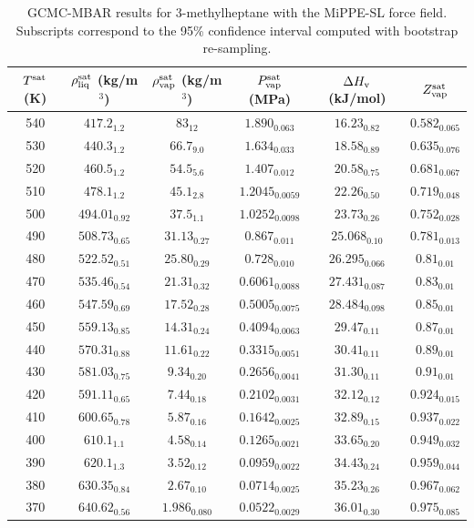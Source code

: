 \documentclass[journal=jctc,manuscript=article]{achemso}
\begin{document}
\begin{table}[htb!]
	\caption{GCMC-MBAR results for 3-methylheptane with the MiPPE-SL force field. Subscripts correspond to the 95\% confidence interval computed with bootstrap re-sampling.}
	\begin{center}
		\begin{tabular}{|c|c|c|c|c|c|}
			\hline
			$T^{\rm sat}$ (K) & $\rho_{\rm liq}^{\rm sat}$ (kg/m$^3$) & $\rho_{\rm vap}^{\rm sat}$ (kg/m$^3$) & $P_{\rm vap}^{\rm sat}$ (MPa) & $\Delta H_{\rm v}$ (kJ/mol) & $Z_{\rm vap}^{\rm sat}$ \\ \hline
			540 & $417.2_{1.2}$ & $83_{12}$ & $1.890_{0.063}$ & $16.23_{0.82}$ & $0.582_{0.065}$ \\
			530 & $440.3_{1.2}$ & $66.7_{9.0}$ & $1.634_{0.033}$ & $18.58_{0.89}$ & $0.635_{0.076}$ \\
			520 & $460.5_{1.2}$ & $54.5_{5.6}$ & $1.407_{0.012}$ & $20.58_{0.75}$ & $0.681_{0.067}$ \\
			510 & $478.1_{1.2}$ & $45.1_{2.8}$ & $1.2045_{0.0059}$ & $22.26_{0.50}$ & $0.719_{0.048}$ \\
			500 & $494.01_{0.92}$ & $37.5_{1.1}$ & $1.0252_{0.0098}$ & $23.73_{0.26}$ & $0.752_{0.028}$ \\
			490 & $508.73_{0.65}$ & $31.13_{0.27}$ & $0.867_{0.011}$ & $25.068_{0.10}$ & $0.781_{0.013}$ \\
			480 & $522.52_{0.51}$ & $25.80_{0.29}$ & $0.728_{0.010}$ & $26.295_{0.066}$ & $0.81_{0.01}$ \\
			470 & $535.46_{0.54}$ & $21.31_{0.32}$ & $0.6061_{0.0088}$ & $27.431_{0.087}$ & $0.83_{0.01}$ \\
			460 & $547.59_{0.69}$ & $17.52_{0.28}$ & $0.5005_{0.0075}$ & $28.484_{0.098}$ & $0.85_{0.01}$ \\
			450 & $559.13_{0.85}$ & $14.31_{0.24}$ & $0.4094_{0.0063}$ & $29.47_{0.11}$ & $0.87_{0.01}$ \\
			440 & $570.31_{0.88}$ & $11.61_{0.22}$ & $0.3315_{0.0051}$ & $30.41_{0.11}$ & $0.89_{0.01}$ \\
			430 & $581.03_{0.75}$ & $9.34_{0.20}$ & $0.2656_{0.0041}$ & $31.30_{0.11}$ & $0.91_{0.01}$ \\
			420 & $591.11_{0.65}$ & $7.44_{0.18}$ & $0.2102_{0.0031}$ & $32.12_{0.12}$ & $0.924_{0.015}$ \\
			410 & $600.65_{0.78}$ & $5.87_{0.16}$ & $0.1642_{0.0025}$ & $32.89_{0.15}$ & $0.937_{0.022}$ \\
			400 & $610.1_{1.1}$ & $4.58_{0.14}$ & $0.1265_{0.0021}$ & $33.65_{0.20}$ & $0.949_{0.032}$ \\
			390 & $620.1_{1.3}$ & $3.52_{0.12}$ & $0.0959_{0.0022}$ & $34.43_{0.24}$ & $0.959_{0.044}$ \\
			380 & $630.35_{0.84}$ & $2.67_{0.10}$ & $0.0714_{0.0025}$ & $35.23_{0.26}$ & $0.967_{0.062}$ \\
			370 & $640.62_{0.56}$ & $1.986_{0.080}$ & $0.0522_{0.0029}$ & $36.01_{0.30}$ & $0.975_{0.085}$ \\
			\hline
		\end{tabular}
	\end{center}
\end{table}
\end{document}

